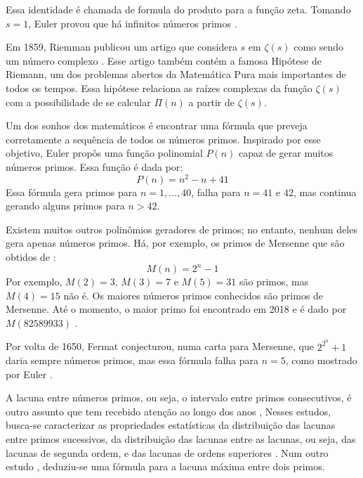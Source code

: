 \documentclass[12pt,a4paper,fleqn]{report}
\begin{document}
\noindent Essa identidade é chamada de
formula do produto para a função zeta. Tomando $s=1$,
Euler provou que há infinitos números primos \cite{ten}.

Em 1859, Riemman
publicou um artigo 
que considera $s$ em $\zeta(s)$ como sendo um número complexo \cite{ten}. Esse artigo também contém a famosa Hipótese de Riemann, um dos problemas abertos da Matemática
Pura mais importantes de todos os tempos. Essa hipótese relaciona as raízes complexas da função $\zeta(s)$ com a possibilidade de se calcular $\Pi(n)$ a partir de $\zeta(s)$.
 


Um dos sonhos dos matemáticos é encontrar uma fórmula que preveja corretamente a sequência de todos os números primos. Inspirado por esse objetivo, 
Euler propôs uma função polinomial $P(n)$ capaz de gerar muitos números primos. Essa função é dada por:
$$P(n) = n^2 - n + 41$$
\noindent Essa fórmula gera primos para $n=1,\ldots,40$, falha para $n=41$ e $42$, mas continua gerando alguns
primos para $n>42$.

Existem muitos outros polinômios geradores de primos; no entanto, nenhum deles gera apenas
números primos. Há, por exemplo, os primos de Mersenne que são obtidos de \cite{ten}:
$$M(n)=2^n-1$$
\noindent Por exemplo, $M(2)=3$, $M(3)=7$ e $M(5)=31$ são primos, mas $M(4)=15$ não é. Os maiores números primos conhecidos são primos de Mersenne. Até o momento, o maior primo foi encontrado em 2018 e é dado por $M(82589933)$ \cite{primes}.

Por volta de 1650, Fermat conjecturou, numa carta para Mersenne, que $2^{2^n}+1$
daria sempre números primos, mas essa fórmula falha para $n=5$, como mostrado por Euler \cite{ten}.


A lacuna entre números primos, ou seja, o intervalo entre primos consecutivos, é outro assunto que tem
recebido atenção ao longo dos anos \cite{e35,g01},
Nesses estudos, busca-se caracterizar as propriedades estatísticas da distribuição das lacunas
entre primos sucessivos, da distribuição das lacunas entre as lacunas, ou seja, das lacunas de segunda ordem, e das lacunas de ordens superiores \cite{a05,a02}. Num outro estudo  \cite{t16}, deduziu-se uma fórmula para a lacuna máxima
entre dois primos.
\end{document}

